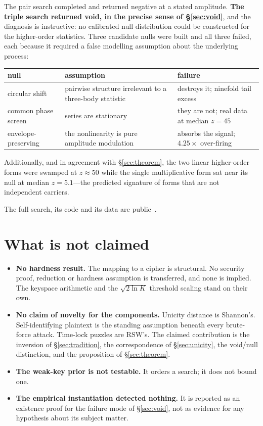 The pair search completed and returned negative at a stated amplitude.
\textbf{The triple search returned void, in the precise sense of
\S\ref{sec:void}}, and the diagnosis is instructive: no calibrated null
distribution could be constructed for the higher-order statistics. Three
candidate nulls were built and all three failed, each because it required a false
modelling assumption about the underlying process:

\begin{center}
\begin{tabular}{@{}p{3.1cm}p{4.6cm}p{5.4cm}@{}}
\toprule
null & assumption & failure \\
\midrule
circular shift & pairwise structure irrelevant to a three-body statistic
  & destroys it; ninefold tail excess \\
common phase screen & series are stationary
  & they are not; real data at median $z=45$ \\
envelope-preserving & the nonlinearity is pure amplitude modulation
  & absorbs the signal; $4.25\times$ over-firing \\
\bottomrule
\end{tabular}
\end{center}

Additionally, and in agreement with \S\ref{sec:theorem}, the two linear
higher-order forms were swamped at $z\approx50$ while the single multiplicative
form sat near its null at median $z=5.1$---the predicted signature of forms that
are not independent carriers.

The full search, its code and its data are public~\cite{griffin}.

\section{What is not claimed}

\begin{itemize}
  \item \textbf{No hardness result.} The mapping to a cipher is structural. No
    security proof, reduction or hardness assumption is transferred, and none is
    implied. The keyspace arithmetic and the $\sqrt{2\ln K}$ threshold scaling
    stand on their own.
  \item \textbf{No claim of novelty for the components.} Unicity distance is
    Shannon's. Self-identifying plaintext is the standing assumption beneath
    every brute-force attack. Time-lock puzzles are RSW's. The claimed
    contribution is the inversion of \S\ref{sec:tradition}, the correspondence of
    \S\ref{sec:unicity}, the void/null distinction, and the proposition of
    \S\ref{sec:theorem}.
  \item \textbf{The weak-key prior is not testable.} It orders a search; it does
    not bound one.
  \item \textbf{The empirical instantiation detected nothing.} It is reported as
    an existence proof for the failure mode of \S\ref{sec:void}, not as evidence
    for any hypothesis about its subject matter.
\end{itemize}

